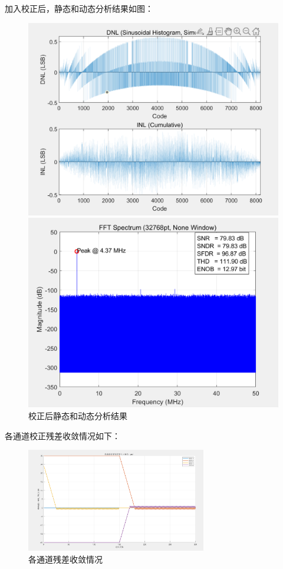 \documentclass[cs4size,a4paper]{ctexart}
\numberwithin{equation}{section}
\numberwithin{table}{section}
\numberwithin{figure}{section}
\begin{document}
\begin{itemize}
		
		加入校正后，静态和动态分析结果如图：
		\begin{figure}[H]
			\centering
			\begin{minipage}{0.49\linewidth}
				\centering
				\includegraphics[width=0.9\linewidth]{figure/result3.png}
			\end{minipage}
			\begin{minipage}{0.49\linewidth}
				\centering
				\includegraphics[width=0.9\linewidth]{figure/result4.png}
			\end{minipage}
			\caption{校正后静态和动态分析结果} 
			\label{fig:result34}
		\end{figure}
		
		各通道校正残差收敛情况如下：
		\begin{figure}[H]
			\centering
			\includegraphics[width=0.7\textwidth]{figure/result5.png}
			\caption{各通道残差收敛情况} 
			\label{fig:result5}
		\end{figure}
		

\end{itemize}
\end{document}
